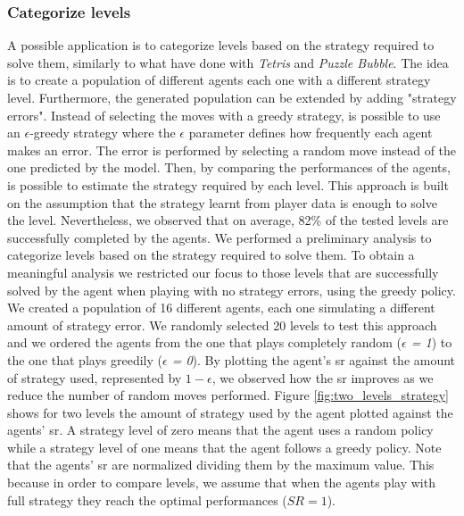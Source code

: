 \subsubsection*{Categorize levels}
A possible application is to categorize levels based on the strategy required to solve them, similarly to what \textcite{isaksen_simulating_2017} have done with \textit{Tetris} and \textit{Puzzle Bubble}. The idea is to create a population of different agents each one with a different strategy level. Furthermore, the generated population can be extended by adding "strategy errors". Instead of selecting the moves with a greedy strategy, is possible to use an $\epsilon$-greedy strategy where the $\epsilon$ parameter defines how frequently each agent makes an error. The error is performed by selecting a random move instead of the one predicted by the model. Then, by comparing the performances of the agents, is possible to estimate the strategy required by each level. This approach is built on the assumption that the strategy learnt from player data is enough to solve the level. Nevertheless, we observed that on average, 82\% of the tested levels are successfully completed by the agents. 
We performed a preliminary analysis to categorize levels based on the strategy required to solve them. To obtain a meaningful analysis we restricted our focus to those levels that are successfully solved by the agent when playing with no strategy errors, using the greedy policy. We created a population of 16 different agents, each one simulating a different amount of strategy error. We randomly selected 20 levels to test this approach and we ordered the agents from the one that plays completely random (\textit{$\epsilon$ = 1}) to the one that plays greedily (\textit{$\epsilon$ = 0}). By plotting the agent's \acs{sr} against the amount of strategy used, represented by \textit{$1 - \epsilon$}, we observed how the \acs{sr} improves as we reduce the number of random moves performed. Figure \ref{fig:two_levels_strategy} shows for two levels the amount of strategy used by the agent plotted against the agents' \acs{sr}. A strategy level of zero means that the agent uses a random policy while a strategy level of one means that the agent follows a greedy policy. Note that the agents' \acs{sr} are normalized dividing them by the maximum value. This because in order to compare levels, we assume that when the agents play with full strategy they reach the optimal performances ($SR = 1$).
